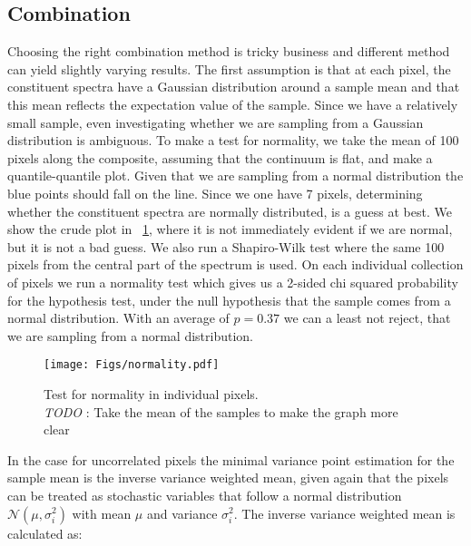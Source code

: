 \documentclass{aa}    %
\newcommand{\figref}[1]{\ref{fig:#1}}
\newcommand{\Fig}[1]{\figurename~\figref{#1}}
\newcommand{\fig}[1]{\Fig{#1}}
\newcommand{\figlabel}[1]{\label{fig:#1}}
\newcommand{\sectlabel}[1]{\label{sect:#1}}
\newcommand{\todo}[3]{{\color{#2}\emph{#1}: #3}}
\newcommand{\jstodo}[1]{\todo{ \\TODO }{green}{#1}}
\begin{document}
\subsection{Combination}  \sectlabel{combine}

Choosing the right combination method is tricky business and different method can yield slightly varying results. The first assumption is that at each pixel, the constituent spectra have a Gaussian distribution around a sample mean and that this mean reflects the expectation value of the sample. Since we have a relatively small sample, even investigating whether we are sampling from a Gaussian distribution is ambiguous. To make a test for normality, we take the mean of 100 pixels along the composite, assuming that the continuum is flat, and make a quantile-quantile plot. Given that we are sampling from a normal distribution the blue points should fall on the line. Since we one have 7 pixels, determining whether the constituent spectra are normally distributed, is a guess at best. We show the crude plot in \fig{normality}, where it is not immediately evident if we are normal, but it is not a bad guess. We also run a Shapiro-Wilk test where the same 100 pixels from the central part of the spectrum is used. On each individual collection of pixels we run a normality test which gives us a 2-sided chi squared probability for the hypothesis test, under the null hypothesis that the sample comes from a normal distribution. With an average of $p = 0.37$ we can a least not reject, that we are sampling from a normal distribution. 

\begin{figure}[hbtp]
  \centering
  \texttt{[image: Figs/normality.pdf]}
  \caption[]{Test for normality in individual pixels. \jstodo{Take the mean of the samples to make the graph more clear}}
 \figlabel{normality}
\end{figure}

In the case for uncorrelated pixels the minimal variance point estimation for the sample mean is the inverse variance weighted mean, given again that the pixels can be treated as stochastic variables that follow a normal distribution $\mathcal{N}(\mu, \sigma_i^2)$ with mean $\mu$ and variance $\sigma_i^2$. The inverse variance weighted mean is calculated as:
\end{document}
